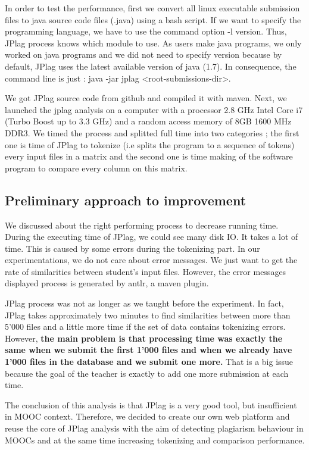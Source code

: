 \documentclass[twoside]{article}
\begin{document}
\begin{multicols*}{2}
In order to test the performance, first we convert all linux executable submission files to java source code files (.java) using a bash script. If we want to specify the programming language, we have to use the command option -l version. Thus, JPlag process knows which module to use. As users make java programs, we only worked on java programs and we did not need to specify version because by default, JPlag uses the latest available version of java (1.7). In consequence, the command line is just : java -jar jplag <root-submissions-dir>. 

We got JPlag source code from github and compiled it with maven. Next, we launched the jplag analysis on a computer with a processor 2.8 GHz Intel Core i7 (Turbo Boost up to 3.3 GHz) and a random access memory of 8GB 1600 MHz DDR3. We timed the process and splitted full time into two categories ; the first one is time of JPlag to tokenize (i.e splits the program to a sequence of tokens) every input files in a matrix and the second one is time making of the software program to compare every column on this matrix. 

\subsection{Preliminary approach to improvement}

We discussed about the right performing process to decrease running time. During the executing time of JPlag, we could see many disk IO. It takes a lot of time. This is caused by some errors during the tokenizing part. In our experimentations, we do not care about error messages. We just want to get the rate of similarities between student's input files. However, the error messages displayed process is generated by antlr, a maven plugin. 

JPlag process was not as longer as we taught before the experiment. In fact, JPlag takes approximately two minutes to find similarities between more than 5'000 files and a little more time if the set of data contains tokenizing errors. However, \textbf{the main problem is that processing time was exactly the same when we submit the first 1'000 files and when we already have 1'000 files in the database and we submit one more.} That is a big issue because the goal of the teacher is exactly to add one more submission at each time. 

The conclusion of this analysis is that JPlag is a very good tool, but insufficient in MOOC context. Therefore, we decided to create our own web platform and reuse the core of JPlag analysis with the aim of detecting plagiarism behaviour in MOOCs and at the same time increasing tokenizing and comparison performance.  


\end{multicols*}
\end{document}

